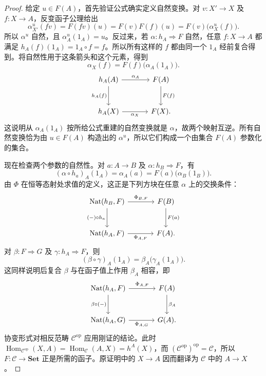\begin{proof}
	给定 \(u\in F(A)\)，首先验证公式确实定义自然变换。对 \(v:X'\rightarrow X\) 及 \(f:X\rightarrow A\)，反变函子公理给出
	\[
		\alpha^u_{X'}(fv)=F(fv)(u)=F(v)F(f)(u) =F(v)\bigl(\alpha^u_X(f)\bigr).
	\]
	所以 \(\alpha^u\) 自然，且 \(\alpha^u_A(1_A)=u\)。反过来，若 \(\alpha:h_A\Rightarrow F\) 自然，任意 \(f:X\rightarrow A\) 都满足 \(h_A(f)(1_A)=1_A\circ f=f\)。所以所有这样的 \(f\) 都由同一个 \(1_A\) 经前复合得到。将自然性用于这条箭头和这个元素，得到
	\[
		\alpha_X(f)=F(f)\bigl(\alpha_A(1_A)\bigr).
	\]
	\[
		\begin{tikzcd}[column sep=large,row sep=large]
			h_A(A)\arrow[r,"\alpha_A"]\arrow[d,"h_A(f)"']&F(A)\arrow[d,"F(f)"]\\
			h_A(X)\arrow[r,"\alpha_X"']&F(X).
		\end{tikzcd}
	\]
	这说明从 \(\alpha_A(1_A)\) 按所给公式重建的自然变换就是 \(\alpha\)，故两个映射互逆。所有自然变换恰为由 \(u\in F(A)\) 构造出的 \(\alpha^u\)，所以它们构成一个由集合 \(F(A)\) 参数化的集合。

	现在检查两个参数的自然性。对 \(a:A\rightarrow B\) 及 \(\alpha:h_B\Rightarrow F\)，有
	\[
		(\alpha\circ h_a)_A(1_A)=\alpha_A(a) =F(a)\bigl(\alpha_B(1_B)\bigr).
	\]
	由 \(\Phi\) 在恒等态射处求值的定义，这正是下列方块在任意 \(\alpha\) 上的交换条件：
	\[
		\begin{tikzcd}[column sep=large,row sep=large]
			\operatorname{Nat}(h_B,F)\arrow[r,"\Phi_{B,F}"]\arrow[d,"{(-)\circ h_a}"']&F(B)\arrow[d,"F(a)"]\\
			\operatorname{Nat}(h_A,F)\arrow[r,"\Phi_{A,F}"']&F(A).
		\end{tikzcd}
	\]
	对 \(\beta:F\Rightarrow G\) 及 \(\gamma:h_A\Rightarrow F\)，则
	\[
		(\beta\circ\gamma)_A(1_A) =\beta_A\bigl(\gamma_A(1_A)\bigr).
	\]
	这同样说明后复合 \(\beta\) 与在函子值上作用 \(\beta_A\) 相容，即
	\[
		\begin{tikzcd}[column sep=large,row sep=large]
			\operatorname{Nat}(h_A,F)\arrow[r,"\Phi_{A,F}"]\arrow[d,"{\beta\circ(-)}"']&F(A)\arrow[d,"\beta_A"]\\
			\operatorname{Nat}(h_A,G)\arrow[r,"\Phi_{A,G}"']&G(A).
		\end{tikzcd}
	\]
	协变形式对相反范畴 \(\mathcal C^{\mathrm{op}}\) 应用刚证的结论。此时 \(\operatorname{Hom}_{\mathcal C^{\mathrm{op}}}(X,A)=\operatorname{Hom}_{\mathcal C}(A,X)=h^A(X)\)，而 \((\mathcal C^{\mathrm{op}})^{\mathrm{op}}=\mathcal C\)，所以 \(F:\mathcal C\to\mathbf{Set}\) 正是所需的函子。原证明中的 \(X\to A\) 因而翻译为 \(\mathcal C\) 中的 \(A\to X\)。
\end{proof}

